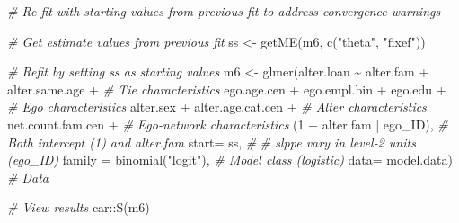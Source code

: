 \documentclass[
]{book}
\newenvironment{Shaded}{\begin{snugshade}}{\end{snugshade}}
\newcommand{\AttributeTok}[1]{\textcolor[rgb]{0.77,0.63,0.00}{#1}}
\newcommand{\CommentTok}[1]{\textcolor[rgb]{0.56,0.35,0.01}{\textit{#1}}}
\newcommand{\DecValTok}[1]{\textcolor[rgb]{0.00,0.00,0.81}{#1}}
\newcommand{\FunctionTok}[1]{\textcolor[rgb]{0.00,0.00,0.00}{#1}}
\newcommand{\NormalTok}[1]{#1}
\newcommand{\OtherTok}[1]{\textcolor[rgb]{0.56,0.35,0.01}{#1}}
\newcommand{\SpecialCharTok}[1]{\textcolor[rgb]{0.00,0.00,0.00}{#1}}
\newcommand{\StringTok}[1]{\textcolor[rgb]{0.31,0.60,0.02}{#1}}
\begin{document}
\begin{Shaded}
\begin{Highlighting}[]
\CommentTok{\# Re{-}fit with starting values from previous fit to address convergence warnings}

\CommentTok{\# Get estimate values from previous fit}
\NormalTok{ss }\OtherTok{\textless{}{-}} \FunctionTok{getME}\NormalTok{(m6, }\FunctionTok{c}\NormalTok{(}\StringTok{"theta"}\NormalTok{, }\StringTok{"fixef"}\NormalTok{))}

\CommentTok{\# Refit by setting ss as starting values }
\NormalTok{m6 }\OtherTok{\textless{}{-}} \FunctionTok{glmer}\NormalTok{(alter.loan }\SpecialCharTok{\textasciitilde{}}\NormalTok{ alter.fam }\SpecialCharTok{+}\NormalTok{ alter.same.age }\SpecialCharTok{+} \CommentTok{\# Tie characteristics}
\NormalTok{              ego.age.cen }\SpecialCharTok{+}\NormalTok{ ego.empl.bin }\SpecialCharTok{+}\NormalTok{ ego.edu }\SpecialCharTok{+} \CommentTok{\# Ego characteristics}
\NormalTok{              alter.sex }\SpecialCharTok{+}\NormalTok{ alter.age.cat.cen }\SpecialCharTok{+}  \CommentTok{\# Alter characteristics}
\NormalTok{              net.count.fam.cen }\SpecialCharTok{+} \CommentTok{\# Ego{-}network characteristics}
\NormalTok{              (}\DecValTok{1} \SpecialCharTok{+}\NormalTok{ alter.fam }\SpecialCharTok{|}\NormalTok{ ego\_ID), }\CommentTok{\# Both intercept (1) and alter.fam }
            \AttributeTok{start=}\NormalTok{ ss, }\CommentTok{\# }
            \CommentTok{\# slppe vary in level{-}2 units (ego\_ID)}
            \AttributeTok{family =} \FunctionTok{binomial}\NormalTok{(}\StringTok{"logit"}\NormalTok{), }\CommentTok{\# Model class (logistic)}
            \AttributeTok{data=}\NormalTok{ model.data) }\CommentTok{\# Data}

\CommentTok{\# View results}
\NormalTok{car}\SpecialCharTok{::}\FunctionTok{S}\NormalTok{(m6)}
\end{Highlighting}
\end{Shaded}
\end{document}
